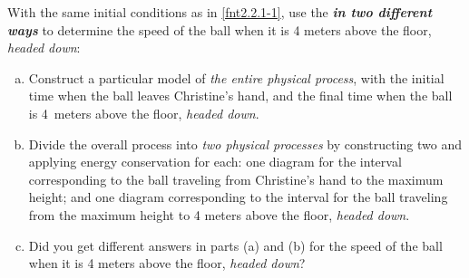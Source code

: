 \label{fnt2.2.1-2}

\noindent With the same initial conditions as in \ref{fnt2.2.1-1}, use the \EnergyInteractionModel{} \textbf{\em in two different ways} to determine the speed of the ball when it is 4 meters above the floor, {\em headed down}:

\begin{enumerate}[(a)]
	\item Construct a particular model of {\em the entire physical process}, with the initial time when the ball leaves Christine's hand, and the final time when the ball is 4~meters above the floor, {\em headed down}.
	\item Divide the overall process into {\em two physical processes} by constructing two \EnergyDiagrams{} and applying energy conservation for each: one diagram for the interval corresponding to the ball traveling from Christine's hand to the maximum height; and one diagram corresponding to the interval for the ball traveling from the maximum height to 4 meters above the floor, {\em headed down}.
	\item Did you get different answers in parts (a) and (b) for the speed of the ball when it is 4 meters above the floor, {\em headed down}?
\end{enumerate}